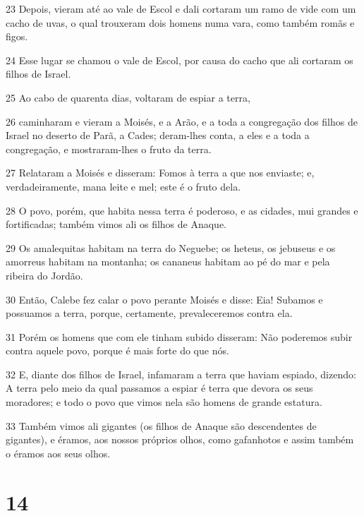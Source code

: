 \par 23 Depois, vieram até ao vale de Escol e dali cortaram um ramo de vide com um cacho de uvas, o qual trouxeram dois homens numa vara, como também romãs e figos.
\par 24 Esse lugar se chamou o vale de Escol, por causa do cacho que ali cortaram os filhos de Israel.
\par 25 Ao cabo de quarenta dias, voltaram de espiar a terra,
\par 26 caminharam e vieram a Moisés, e a Arão, e a toda a congregação dos filhos de Israel no deserto de Parã, a Cades; deram-lhes conta, a eles e a toda a congregação, e mostraram-lhes o fruto da terra.
\par 27 Relataram a Moisés e disseram: Fomos à terra a que nos enviaste; e, verdadeiramente, mana leite e mel; este é o fruto dela.
\par 28 O povo, porém, que habita nessa terra é poderoso, e as cidades, mui grandes e fortificadas; também vimos ali os filhos de Anaque.
\par 29 Os amalequitas habitam na terra do Neguebe; os heteus, os jebuseus e os amorreus habitam na montanha; os cananeus habitam ao pé do mar e pela ribeira do Jordão.
\par 30 Então, Calebe fez calar o povo perante Moisés e disse: Eia! Subamos e possuamos a terra, porque, certamente, prevaleceremos contra ela.
\par 31 Porém os homens que com ele tinham subido disseram: Não poderemos subir contra aquele povo, porque é mais forte do que nós.
\par 32 E, diante dos filhos de Israel, infamaram a terra que haviam espiado, dizendo: A terra pelo meio da qual passamos a espiar é terra que devora os seus moradores; e todo o povo que vimos nela são homens de grande estatura.
\par 33 Também vimos ali gigantes (os filhos de Anaque são descendentes de gigantes), e éramos, aos nossos próprios olhos, como gafanhotos e assim também o éramos aos seus olhos.

\chapter{14}

